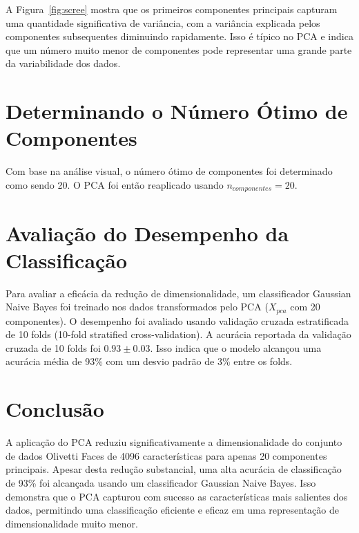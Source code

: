 \documentclass{article}
\begin{document}
A Figura~\ref{fig:scree} mostra que os primeiros componentes principais capturam uma quantidade significativa de variância, com a variância explicada pelos componentes subsequentes diminuindo rapidamente.
Isso é típico no PCA e indica que um número muito menor de componentes pode representar uma grande parte da variabilidade dos dados. 

\section{Determinando o Número Ótimo de Componentes}
Com base na análise visual, o número ótimo de componentes foi determinado como sendo 20.
O PCA foi então reaplicado usando $n_{componentes} = 20$.

\section{Avaliação do Desempenho da Classificação}
Para avaliar a eficácia da redução de dimensionalidade, um classificador Gaussian Naive Bayes foi treinado nos dados transformados pelo PCA ($X_{pca}$ com 20 componentes). 
O desempenho foi avaliado usando validação cruzada estratificada de 10 folds (10-fold stratified cross-validation). 
A acurácia reportada da validação cruzada de 10 folds foi $0.93 \pm 0.03$.
Isso indica que o modelo alcançou uma acurácia média de 93\% com um desvio padrão de 3\% entre os folds. 

\section{Conclusão}
A aplicação do PCA reduziu significativamente a dimensionalidade do conjunto de dados Olivetti Faces de 4096 características para apenas 20 componentes principais. 
Apesar desta redução substancial, uma alta acurácia de classificação de 93\% foi alcançada usando um classificador Gaussian Naive Bayes. 
Isso demonstra que o PCA capturou com sucesso as características mais salientes dos dados, permitindo uma classificação eficiente e eficaz em uma representação de dimensionalidade muito menor. 
\end{document}
